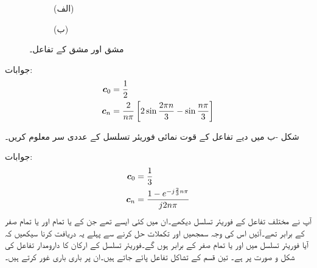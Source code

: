 \begin{figure}
\centering
\begin{subfigure}{0.5\textwidth}
\centering
{}
\caption*{(الف)}
\end{subfigure}%
\begin{subfigure}{0.5\textwidth}
\centering
{}
\caption*{(ب)}
\end{subfigure}%
\caption{مشق  اور مشق  کے تفاعل۔}
\label{شکل_فوریئر_جفت_تفاعل_قوت_نمائی_تسلسل_الف}
\end{figure}

جوابات:
\begin{align*}
{\ensuremath{{\boldsymbol{c}}}}_0&=\frac{1}{2}\\
{{\boldsymbol{c}}}_n&=\frac{2}{n\pi}\left[2\sin \frac{2\pi n}{3}-\sin\frac{n\pi}{3}\right]
\end{align*}

شکل -ب میں دیے تفاعل کے قوت نمائی فوریئر تسلسل کے عددی سر معلوم کریں۔

جوابات:
\begin{align*}
{\ensuremath{{\boldsymbol{c}}}}_0&=\frac{1}{3}\\
{{\boldsymbol{c}}}_n&=\frac{1-e^{-j\frac{2}{3}n\pi}}{j2n\pi}
\end{align*}
آپ نے مختلف تفاعل کے فوریئر تسلسل دیکھے۔ان میں کئی ایسے تھے جن کے یا تمام  اور یا تمام  صفر کے برابر تھے۔آئیں اس کی وجہ سمجھیں اور تکملات حل کرنے سے پہلے یہ دریافت کرنا سیکھیں کہ آیا فوریئر تسلسل میں  اور یا تمام  صفر کے برابر ہوں گے۔فوریئر تسلسل کے ارکان کا دارومدار تفاعل کی شکل و صورت پر ہے۔ تین قسم کے تشاکل تفاعل پائے جاتے ہیں۔ان پر باری باری غور کرتے ہیں۔


